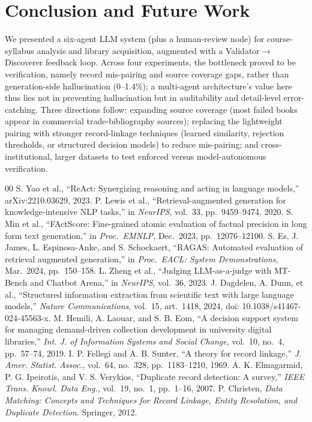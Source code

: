 \documentclass[conference]{IEEEtran}
\begin{document}
\section{Conclusion and Future Work}

We presented a six-agent LLM system (plus a human-review node) for
course-syllabus analysis and library acquisition, augmented with a
Validator$\rightarrow$Discoverer feedback loop. Across four experiments, the
bottleneck proved to be verification, namely record mis-pairing and source
coverage gaps, rather than generation-side hallucination (0--1.4\%); a
multi-agent
architecture's value here thus lies not in preventing hallucination but in
auditability and detail-level error-catching. Three directions follow: expanding
source coverage (most failed books appear in commercial trade-bibliography
sources); replacing the lightweight pairing with stronger record-linkage
techniques (learned similarity, rejection thresholds, or structured decision
models) to reduce mis-pairing; and cross-institutional, larger datasets to test
enforced versus model-autonomous verification.

\begin{thebibliography}{00}
 S. Yao et al., ``ReAct: Synergizing reasoning and acting in language models,'' arXiv:2210.03629, 2023.
 P. Lewis et al., ``Retrieval-augmented generation for knowledge-intensive NLP tasks,'' in \textit{NeurIPS}, vol.\ 33, pp.\ 9459--9474, 2020.
 S. Min et al., ``FActScore: Fine-grained atomic evaluation of factual precision in long form text generation,'' in \textit{Proc.\ EMNLP}, Dec.\ 2023, pp.\ 12076--12100.
 S. Es, J. James, L. Espinosa-Anke, and S. Schockaert, ``RAGAS: Automated evaluation of retrieval augmented generation,'' in \textit{Proc.\ EACL: System Demonstrations}, Mar.\ 2024, pp.\ 150--158.
 L. Zheng et al., ``Judging LLM-as-a-judge with MT-Bench and Chatbot Arena,'' in \textit{NeurIPS}, vol.\ 36, 2023.
 J. Dagdelen, A. Dunn, et al., ``Structured information extraction from scientific text with large language models,'' \textit{Nature Communications}, vol.\ 15, art.\ 1418, 2024, doi: 10.1038/s41467-024-45563-x.
 M. Hemili, A. Laouar, and S. B. Eom, ``A decision support system for managing demand-driven collection development in university digital libraries,'' \textit{Int. J. of Information Systems and Social Change}, vol.\ 10, no.\ 4, pp.\ 57--74, 2019.
 I. P. Fellegi and A. B. Sunter, ``A theory for record linkage,'' \textit{J. Amer. Statist. Assoc.}, vol.\ 64, no.\ 328, pp.\ 1183--1210, 1969.
 A. K. Elmagarmid, P. G. Ipeirotis, and V. S. Verykios, ``Duplicate record detection: A survey,'' \textit{IEEE Trans. Knowl. Data Eng.}, vol.\ 19, no.\ 1, pp.\ 1--16, 2007.
 P. Christen, \textit{Data Matching: Concepts and Techniques for Record Linkage, Entity Resolution, and Duplicate Detection}. Springer, 2012.
\end{thebibliography}
\end{document}

